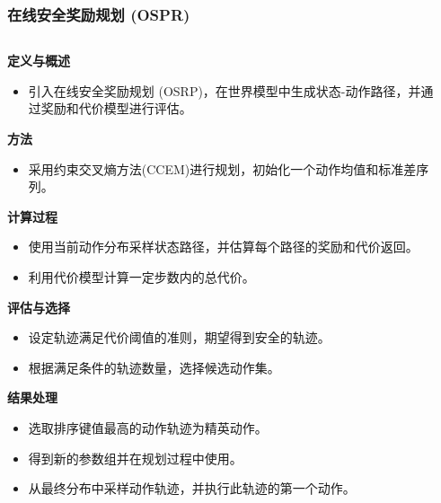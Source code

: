 \documentclass[10pt,mathserif]{beamer}%
\begin{document}
\begin{frame}[t, fragile]
\frametitle{在线安全奖励规划 (OSPR)}
\begin{columns}[c]
\begin{column}{0.45\textwidth}

\vspace{-1cm}

{\fontsize{6pt}{7.2pt}\selectfont\textbf{定义与概述}
\begin{itemize}
\item 引入在线安全奖励规划 (OSRP)，在世界模型中生成状态-动作路径，并通过奖励和代价模型进行评估。
\end{itemize}
    \textbf{方法}\\
    \begin{itemize}
      \item 采用约束交叉熵方法(CCEM)进行规划，初始化一个动作均值和标准差序列。
    \end{itemize}

    \textbf{计算过程}\\
    \begin{itemize}
      \item 使用当前动作分布采样状态路径，并估算每个路径的奖励和代价返回。
      \item 利用代价模型计算一定步数内的总代价。
    \end{itemize}

    \textbf{评估与选择}\\
    \begin{itemize}
      \item 设定轨迹满足代价阈值的准则，期望得到安全的轨迹。
      \item 根据满足条件的轨迹数量，选择候选动作集。
    \end{itemize}
    
    \textbf{结果处理}\\
    \begin{itemize}
      \item 选取排序键值最高的动作轨迹为精英动作。
      \item 得到新的参数组并在规划过程中使用。
      \item 从最终分布中采样动作轨迹，并执行此轨迹的第一个动作。
    \end{itemize}
  }
\end{column}

\begin{column}{0.55\textwidth}
    \begin{spacing}{1.5}
   

\end{spacing}
\end{column}
\end{columns}
\end{frame}
\end{document}
